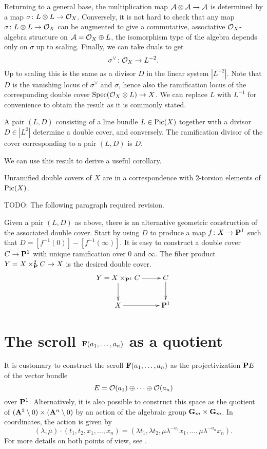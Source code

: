 Returning to a general base, the multiplication map $\Ac \otimes \Ac \rarr \Ac$ is determined by a map $\sigma \cn L \otimes L \rarr \Oc_X$. Conversely, it is not hard to check that any map $\sigma \cn L \otimes L \rarr \Oc_X$ can be augmented to give a commutative, associative $\mathcal{O}_X$-algebra structure on $\mathcal{A} = \mathcal{O}_X \oplus L$, the isomorphism type of the algebra depends only on $\sigma$ up to scaling. Finally, we can take duals to get
\[
\sigma^\vee \cn \Oc_X \rarr L^{-2}.
\]
Up to scaling this is the same as a divisor $D$ in the linear system $|L^{-2}|$. Note that $D$ is the vanishing locus of $\sigma^\vee$ and $\sigma$, hence also the ramification locus of the corresponding double cover $\Spec(\Oc_X \otimes L) \rarr X$. We can replace $L$ with $L^{-1}$ for convenience to obtain the result as it is commonly stated.

\begin{proposition}
  A pair $(L,D)$ consisting of a line bundle $L \in \operatorname{Pic}(X)$ together with a divisor $D \in |L^2|$ determine a double cover, and conversely. The ramification divisor of the cover corresponding to a pair $(L,D)$ is $D$.
\end{proposition}

We can use this result to derive a useful corollary.

\begin{corollary}
  Unramified double covers of $X$ are in a correspondence with 2-torsion elements of $\operatorname{Pic}(X)$.
\end{corollary}

TODO: The following paragraph required revision.

Given a pair $(L,D)$ as above, there is an alternative geometric construction of the associated double cover. Start by using $D$ to produce a map $f \cn X \rarr \Pbb^1$ such that $D = [f^{-1}(0)] - [f^{-1}(\infty)]$. It is easy to construct a double cover $C \rarr \Pbb^1$ with unique ramification over $0$ and $\infty$. The fiber product $Y = X \x_\Pbb^2 C \rarr X$ is the desired double cover.
\[\xymatrix{
  Y = X \x_{\Pbb^1} C \ar[r] \ar[d] & C \ar[d] \\
  X \ar[r] & \Pbb^1
}\]


\section{The scroll $\mathbf{F}(a_1, \dots, a_n)$ as a quotient}

It is customary to construct the scroll $\mathbf{F}(a_1, \dots, a_n)$ as the projectivization $\mathbf{P} E$ of the vector bundle
\[
E = \mathcal{O}(a_1) \oplus \cdots \oplus \mathcal{O}(a_n)
\]
over $\mathbf{P}^1$. Alternatively, it is also possible to construct this space as the quotient of $(\mathbf{A}^2 \setminus 0) \times (\mathbf{A}^n \setminus 0)$ by an action of the algebraic group $\mathbf{G}_m \times \mathbf{G}_m$. In coordinates, the action is given by
\[
(\lambda, \mu) \cdot (t_1, t_2, x_1, \dots, x_n) =
(\lambda t_1, \lambda t_2, \mu \lambda^{-a_1} x_1, \dots, \mu \lambda^{-a_n} x_n).
\]
For more details on both points of view, see \cite[Chapter 2]{Reid-surfaces}.


